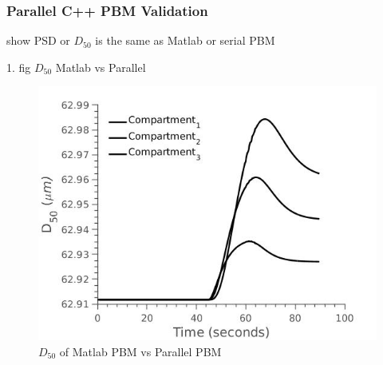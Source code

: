 \documentclass[preprint,11pt,authoryear]{elsarticle}
\begin{document}
	
	    \subsubsection{Parallel C++ PBM Validation}
	   \par show PSD or $D_50$ is the same as Matlab or serial PBM
	   \par 1. fig $D_50$ Matlab vs Parallel
	      \begin{figure}[!htb]
	      \centering
	      \includegraphics[scale=0.5]{rslts_pbm_d_50_pll_vldtn}
	      \caption{ $D_{50}$ of Matlab PBM vs Parallel PBM}
	      \label{fig:rslts_pbm_d_50_vldtn}
	      \end{figure}
	    
\end{document}
